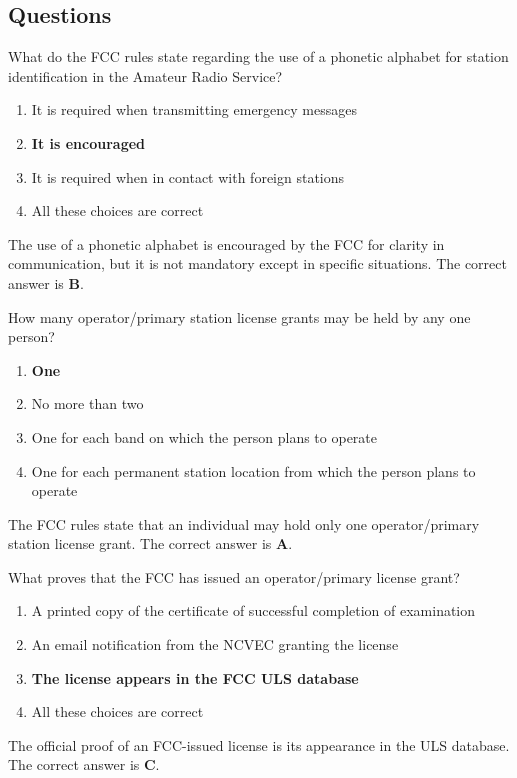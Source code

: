 \subsection*{Questions}

\begin{tcolorbox}[colback=gray!10!white,colframe=black!75!black,title={T1A03}]
    What do the FCC rules state regarding the use of a phonetic alphabet for station identification in the Amateur Radio Service?
    \begin{enumerate}[label=\Alph*),noitemsep]
        \item It is required when transmitting emergency messages
        \item \textbf{It is encouraged}
        \item It is required when in contact with foreign stations
        \item All these choices are correct
    \end{enumerate}
\end{tcolorbox}
The use of a phonetic alphabet is encouraged by the FCC for clarity in communication, but it is not mandatory except in specific situations. The correct answer is \textbf{B}.


\begin{tcolorbox}[colback=gray!10!white,colframe=black!75!black,title={T1A04}]
    How many operator/primary station license grants may be held by any one person?
    \begin{enumerate}[label=\Alph*),noitemsep]
        \item \textbf{One}
        \item No more than two
        \item One for each band on which the person plans to operate
        \item One for each permanent station location from which the person plans to operate
    \end{enumerate}
\end{tcolorbox}
The FCC rules state that an individual may hold only one operator/primary station license grant. The correct answer is \textbf{A}.


\begin{tcolorbox}[colback=gray!10!white,colframe=black!75!black,title={T1A05}]
    What proves that the FCC has issued an operator/primary license grant?
    \begin{enumerate}[label=\Alph*),noitemsep]
        \item A printed copy of the certificate of successful completion of examination
        \item An email notification from the NCVEC granting the license
        \item \textbf{The license appears in the FCC ULS database}
        \item All these choices are correct
    \end{enumerate}
\end{tcolorbox}
The official proof of an FCC-issued license is its appearance in the ULS database. The correct answer is \textbf{C}.

